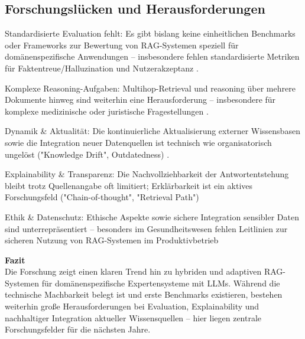 \subsection{Forschungslücken und Herausforderungen }
Standardisierte Evaluation fehlt: Es gibt bislang keine einheitlichen Benchmarks oder Frameworks zur Bewertung von RAG-Systemen speziell für domänenspezifische Anwendungen – insbesondere fehlen standardisierte Metriken für Faktentreue/Halluzination und Nutzerakzeptanz \cite{Gao2023Retrieval-Augmented} \cite{Elmitwalli2025Scalable} \cite{Murtiyoso2025A}.

Komplexe Reasoning-Aufgaben: Multihop-Retrieval und reasoning über mehrere Dokumente hinweg sind weiterhin eine Herausforderung – insbesondere für komplexe medizinische oder juristische Fragestellungen \cite{Zhang2025A}.

Dynamik \& Aktualität: Die kontinuierliche Aktualisierung externer Wissensbasen sowie die Integration neuer Datenquellen ist technisch wie organisatorisch ungelöst ("Knowledge Drift", Outdatedness) \cite{Liu2024DRAK}.

Explainability \& Transparenz: Die Nachvollziehbarkeit der Antwortentstehung bleibt trotz Quellenangabe oft limitiert; Erklärbarkeit ist ein aktives Forschungsfeld ("Chain-of-thought", "Retrieval Path") \cite{Feng2023Knowledge}

Ethik \& Datenschutz: Ethische Aspekte sowie sichere Integration sensibler Daten sind unterrepräsentiert – besonders im Gesundheitswesen fehlen Leitlinien zur sicheren Nutzung von RAG-Systemen im Produktivbetrieb \cite{Elmitwalli2025Scalable}

\vspace{1cm}
\textbf{Fazit}\\
Die Forschung zeigt einen klaren Trend hin zu hybriden und adaptiven RAG-Systemen für domänenspezifische Expertensysteme mit LLMs. Während die technische Machbarkeit belegt ist und erste Benchmarks existieren, bestehen weiterhin große Herausforderungen bei Evaluation, Explainability und nachhaltiger Integration aktueller Wissensquellen – hier liegen zentrale Forschungsfelder für die nächsten Jahre.
\clearpage